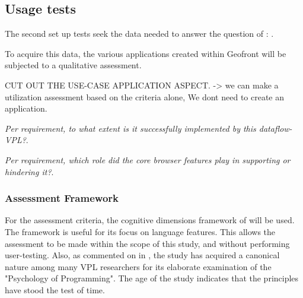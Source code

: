 \subsection{Usage tests}

The second set up tests seek the data needed to answer the question of \mySubRQFourTitle: \mySubRQFour.

To acquire this data, the various applications created within Geofront will be subjected to a qualitative assessment. 


\begin{note}
  CUT OUT THE USE-CASE APPLICATION ASPECT. 
  -> we can make a utilization assessment based on the criteria alone, We dont need to create an application.

\item \emph{Per requirement, to what extent is it successfully implemented by this dataflow-VPL?}.
  \item \emph{Per requirement, which role did the core browser features play in supporting or hindering it?}.

\end{note}


\subsubsection{Assessment Framework}
For the assessment criteria, the cognitive dimensions framework of \cite[]{green_usability_1996} will be used. 
The framework is useful for its focus on language features. 
This allows the assessment to be made within the scope of this study, and without performing user-testing.
Also, as commented on in , the study has acquired a canonical nature among many VPL researchers for its elaborate examination of the "Psychology of Programming".
The age of the study indicates that the principles have stood the test of time. 

